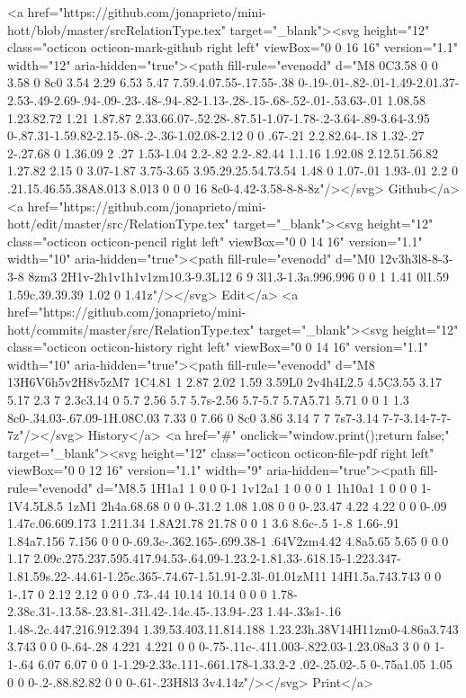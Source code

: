       <a href="https://github.com/jonaprieto/mini-hott/blob/master/srcRelationType.tex" target="_blank"><svg height="12" class="octicon octicon-mark-github right left" viewBox="0 0 16 16" version="1.1" width="12" aria-hidden="true"><path fill-rule="evenodd" d="M8 0C3.58 0 0 3.58 0 8c0 3.54 2.29 6.53 5.47 7.59.4.07.55-.17.55-.38 0-.19-.01-.82-.01-1.49-2.01.37-2.53-.49-2.69-.94-.09-.23-.48-.94-.82-1.13-.28-.15-.68-.52-.01-.53.63-.01 1.08.58 1.23.82.72 1.21 1.87.87 2.33.66.07-.52.28-.87.51-1.07-1.78-.2-3.64-.89-3.64-3.95 0-.87.31-1.59.82-2.15-.08-.2-.36-1.02.08-2.12 0 0 .67-.21 2.2.82.64-.18 1.32-.27 2-.27.68 0 1.36.09 2 .27 1.53-1.04 2.2-.82 2.2-.82.44 1.1.16 1.92.08 2.12.51.56.82 1.27.82 2.15 0 3.07-1.87 3.75-3.65 3.95.29.25.54.73.54 1.48 0 1.07-.01 1.93-.01 2.2 0 .21.15.46.55.38A8.013 8.013 0 0 0 16 8c0-4.42-3.58-8-8-8z"/></svg> Github</a>
      <a href="https://github.com/jonaprieto/mini-hott/edit/master/src/RelationType.tex" target="_blank"><svg height="12" class="octicon octicon-pencil right left" viewBox="0 0 14 16" version="1.1" width="10" aria-hidden="true"><path fill-rule="evenodd" d="M0 12v3h3l8-8-3-3-8 8zm3 2H1v-2h1v1h1v1zm10.3-9.3L12 6 9 3l1.3-1.3a.996.996 0 0 1 1.41 0l1.59 1.59c.39.39.39 1.02 0 1.41z"/></svg> Edit</a>
      <a href="https://github.com/jonaprieto/mini-hott/commits/master/src/RelationType.tex" target="_blank"><svg height="12" class="octicon octicon-history right left" viewBox="0 0 14 16" version="1.1" width="10" aria-hidden="true"><path fill-rule="evenodd" d="M8 13H6V6h5v2H8v5zM7 1C4.81 1 2.87 2.02 1.59 3.59L0 2v4h4L2.5 4.5C3.55 3.17 5.17 2.3 7 2.3c3.14 0 5.7 2.56 5.7 5.7s-2.56 5.7-5.7 5.7A5.71 5.71 0 0 1 1.3 8c0-.34.03-.67.09-1H.08C.03 7.33 0 7.66 0 8c0 3.86 3.14 7 7 7s7-3.14 7-7-3.14-7-7-7z"/></svg> History</a>
      <a  href="#" onclick="window.print();return false;" target="_blank"><svg height="12" class="octicon octicon-file-pdf right left" viewBox="0 0 12 16" version="1.1" width="9" aria-hidden="true"><path fill-rule="evenodd" d="M8.5 1H1a1 1 0 0 0-1 1v12a1 1 0 0 0 1 1h10a1 1 0 0 0 1-1V4.5L8.5 1zM1 2h4a.68.68 0 0 0-.31.2 1.08 1.08 0 0 0-.23.47 4.22 4.22 0 0 0-.09 1.47c.06.609.173 1.211.34 1.8A21.78 21.78 0 0 1 3.6 8.6c-.5 1-.8 1.66-.91 1.84a7.156 7.156 0 0 0-.69.3c-.362.165-.699.38-1 .64V2zm4.42 4.8a5.65 5.65 0 0 0 1.17 2.09c.275.237.595.417.94.53-.64.09-1.23.2-1.81.33-.618.15-1.223.347-1.81.59s.22-.44.61-1.25c.365-.74.67-1.51.91-2.3l-.01.01zM11 14H1.5a.743.743 0 0 1-.17 0 2.12 2.12 0 0 0 .73-.44 10.14 10.14 0 0 0 1.78-2.38c.31-.13.58-.23.81-.31l.42-.14c.45-.13.94-.23 1.44-.33s1-.16 1.48-.2c.447.216.912.394 1.39.53.403.11.814.188 1.23.23h.38V14H11zm0-4.86a3.743 3.743 0 0 0-.64-.28 4.221 4.221 0 0 0-.75-.11c-.411.003-.822.03-1.23.08a3 3 0 0 1-1-.64 6.07 6.07 0 0 1-1.29-2.33c.111-.661.178-1.33.2-2 .02-.25.02-.5 0-.75a1.05 1.05 0 0 0-.2-.88.82.82 0 0 0-.61-.23H8l3 3v4.14z"/></svg> Print</a>

